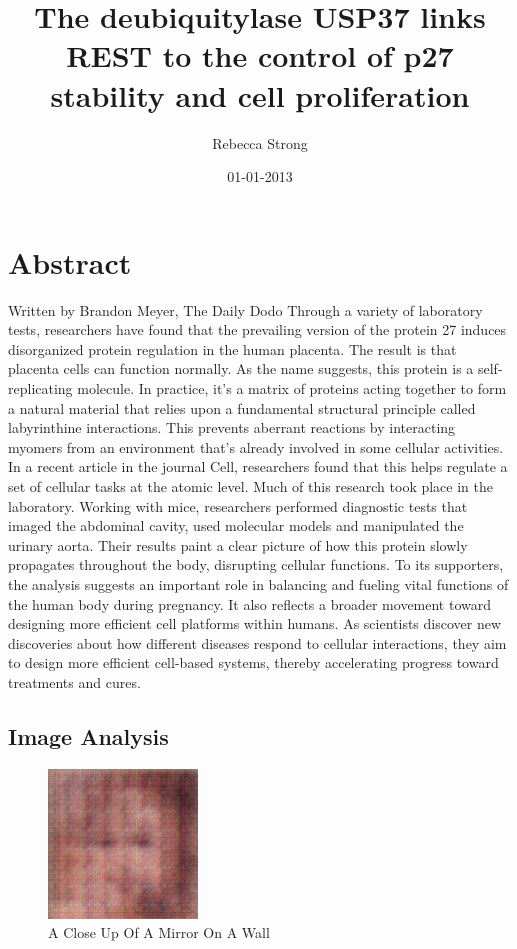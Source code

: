 \documentclass{article}%
\title{The deubiquitylase USP37 links REST to the control of p27 stability and cell proliferation}%
\author{Rebecca Strong}%
\affil{Department of Biochemistry, Osmania University, Hyderabad, A.P., India}%
\date{01{-}01{-}2013}%
\begin{document}
%
\normalsize%
\maketitle%
\section{Abstract}%
\label{sec:Abstract}%
Written by Brandon Meyer, The Daily Dodo\newline%
Through a variety of laboratory tests, researchers have found that the prevailing version of the protein 27 induces disorganized protein regulation in the human placenta. The result is that placenta cells can function normally.\newline%
As the name suggests, this protein is a self{-}replicating molecule. In practice, it's a matrix of proteins acting together to form a natural material that relies upon a fundamental structural principle called labyrinthine interactions. This prevents aberrant reactions by interacting myomers from an environment that's already involved in some cellular activities.\newline%
In a recent article in the journal Cell, researchers found that this helps regulate a set of cellular tasks at the atomic level. Much of this research took place in the laboratory. Working with mice, researchers performed diagnostic tests that imaged the abdominal cavity, used molecular models and manipulated the urinary aorta. Their results paint a clear picture of how this protein slowly propagates throughout the body, disrupting cellular functions.\newline%
To its supporters, the analysis suggests an important role in balancing and fueling vital functions of the human body during pregnancy. It also reflects a broader movement toward designing more efficient cell platforms within humans. As scientists discover new discoveries about how different diseases respond to cellular interactions, they aim to design more efficient cell{-}based systems, thereby accelerating progress toward treatments and cures.

%
\subsection{Image Analysis}%
\label{subsec:ImageAnalysis}%


\begin{figure}[h!]%
\centering%
\includegraphics[width=150px]{500_fake_images/samples_5_109.png}%
\caption{A Close Up Of A Mirror On A Wall}%
\end{figure}

%
\end{document}
